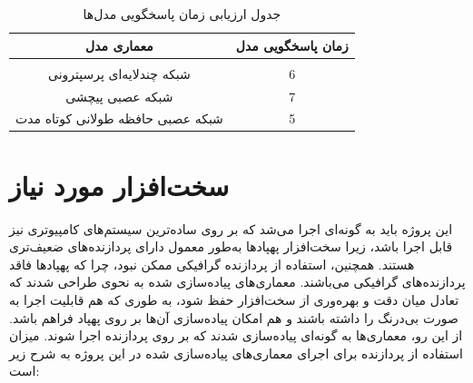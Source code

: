 \begin{table}[h!]
    \centering
    \begin{tabular}{||c c||}
     \hline
     \rule{0pt}{3ex}معماری مدل & زمان پاسخگویی مدل\\ [1.5ex]
     \hline
     \hline
     \rule{0pt}{0.5ex} & \\  %
     شبکه چندلایه‌ای پرسپترونی & 6 \\ [2.5ex]
     شبکه عصبی پیچشی & 7 \\ [2.5ex]
     شبکه عصبی  حافظه طولانی کوتاه مدت & 5 \\ [2.5ex]
     \hline
    \end{tabular}
    \caption{جدول ارزیابی زمان پاسخگویی مدل‌ها}
    \label{table:1}
\end{table}


\section{سخت‌افزار مورد نیاز}
این پروژه باید به گونه‌ای اجرا می‌شد که بر روی ساده‌ترین سیستم‌های کامپیوتری نیز قابل اجرا باشد، زیرا سخت‌افزار پهپادها به‌طور معمول دارای پردازنده‌های ضعیف‌تری هستند. همچنین، استفاده از پردازنده گرافیکی ممکن نبود، چرا که پهپادها فاقد پردازنده‌های گرافیکی می‌باشند. 
معماری‌های پیاده‌سازی شده به نحوی طراحی شدند که تعادل میان دقت و بهره‌وری از سخت‌افزار حفظ شود، به طوری که هم قابلیت اجرا به صورت بی‌درنگ را داشته باشند و هم امکان پیاده‌سازی آن‌ها بر روی پهپاد فراهم باشد. از این رو، معماری‌ها به گونه‌ای پیاده‌سازی شدند که بر روی پردازنده اجرا شوند.
میزان استفاده از پردازنده برای اجرای معماری‌های پیاده‌سازی شده در این پروژه به شرح زیر است:



